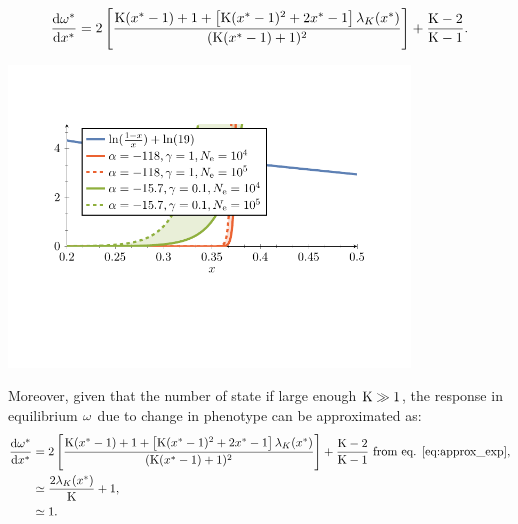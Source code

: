 \documentclass{article}
\begin{document}
\begin{gather}
\frac{\mathrm{d} \omega^{*}}{\mathrm{d} x^{*}} = 2 \left[ \frac{\text{K} (x^{*}- 1) + 1+\left[\text{K} (x^{*}-1)^2+2 x^{*}-1\right] \lambda_{K}(x^{*}) }{(\text{K} (x^{*}-1)+1)^2}\right] + \frac{\text{K} - 2}{\text{K} - 1} \label{eq:dw_dx}.
\end{gather}
\begin{center}
 \includegraphics[width=0.8\textwidth, page=3] {figures.pdf}
\end{center}
Moreover, given that the number of state if large enough $\text{K} \gg 1$, the response in equilibrium $\omega$ due to change in phenotype can be approximated as:
\begin{align}
\frac{ \mathrm{d} \omega^{*}}{\mathrm{d} x^{*}}  & = 2 \left[ \frac{\text{K} (x^{*}- 1) + 1+\left[\text{K} (x^{*}-1)^2+2 x^{*}-1\right] \lambda_{K}(x^{*}) }{(\text{K} (x^{*}-1)+1)^2}\right] + \frac{\text{K} - 2}{\text{K} - 1}\text{ from eq. \ref{eq:approx_exp}}, \\
& \simeq \frac{2 \lambda_{K}(x^{*})}{\text{K}} + 1, \\
& \simeq 1. \label{eq:approx_domega_dx}
\end{align}
\end{document}
